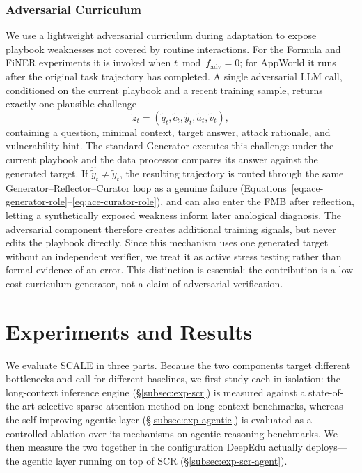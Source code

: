 \documentclass[10pt,conference]{IEEEtran}
\begin{document}
\subsubsection{Adversarial Curriculum}
\label{subsubsec:ace-adversarial}

We use a lightweight adversarial curriculum during adaptation to
expose playbook weaknesses not covered by routine interactions. For the
Formula and FiNER experiments it is invoked when
$t\bmod f_{\mathrm{adv}}=0$; for AppWorld it runs after the original
task trajectory has completed. A single adversarial 
LLM call, conditioned on the current playbook and a recent training 
sample, returns exactly one plausible challenge
\begin{equation}
    \tilde z_t=(\tilde q_t,\tilde c_t,\tilde y_t,\tilde a_t,\tilde v_t),
    \label{eq:ace-adversarial-schema}
\end{equation}
containing a question, minimal context, target answer, attack rationale, 
and vulnerability hint. The standard Generator executes this challenge 
under the current playbook and the data processor compares its answer 
against the generated target. If $\hat{\tilde y}_t\neq\tilde y_t$, the
resulting trajectory is routed through the same
Generator--Reflector--Curator loop as a genuine failure
(Equations~\eqref{eq:ace-generator-role}--\eqref{eq:ace-curator-role}), and
can also enter the FMB after reflection, letting a synthetically exposed
weakness inform later analogical diagnosis. The
adversarial component therefore creates additional training signals, but 
never edits the playbook directly. Since this mechanism uses one
generated target without an independent verifier, we treat it as active 
stress testing rather than formal evidence of an error. This distinction 
is essential: the contribution is a low-cost curriculum generator, not a
claim of adversarial verification.

\section{Experiments and Results}
\label{sec:experiments}

We evaluate SCALE in three parts. Because the two components target
different bottlenecks and call for different baselines, we first study
each in isolation: the long-context inference engine
(§\ref{subsec:exp-scr}) is measured against a state-of-the-art selective
sparse attention method on long-context benchmarks, whereas the
self-improving agentic layer (§\ref{subsec:exp-agentic}) is evaluated as
a controlled ablation over its mechanisms on agentic reasoning
benchmarks. We then measure the two together in the configuration DeepEdu
actually deploys---the agentic layer running on top of SCR
(§\ref{subsec:exp-scr-agent}).
\end{document}
